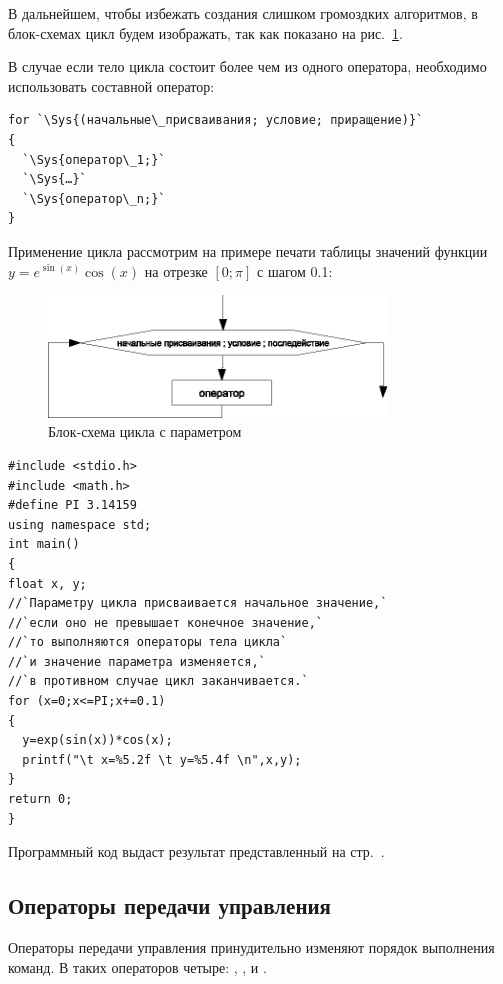 В дальнейшем, чтобы избежать создания слишком громоздких алгоритмов, в блок-схемах цикл  будем
изображать, так как показано на рис.~\ref{ch03:refDrawing25}.

В случае если тело цикла состоит более чем из одного оператора, необходимо использовать составной оператор:
\begin{lstlisting}
for `\Sys{(начальные\_присваивания; условие; приращение)}`
{
  `\Sys{оператор\_1;}`
  `\Sys{…}`
  `\Sys{оператор\_n;}`
}
\end{lstlisting}
Применение цикла  рассмотрим на примере печати таблицы значений функции  $y=e^{\sin (x)}\cos (x)$
на отрезке  $[0;\pi]$  с шагом 0.1:
\begin{figure}[htb]
\begin{center}
\includegraphics[width=0.8\textwidth]{img/ris_3_26}
\caption{Блок-схема цикла с параметром}
\label{ch03:refDrawing25}
\end{center}
\end{figure}

\begin{lstlisting}
#include <stdio.h>
#include <math.h>
#define PI 3.14159
using namespace std;
int main()
{
float x, y;
//`Параметру цикла присваивается начальное значение,`
//`если оно не превышает конечное значение,`
//`то выполняются операторы тела цикла`
//`и значение параметра изменяется,`
//`в противном случае цикл заканчивается.`
for (x=0;x<=PI;x+=0.1)
{
  y=exp(sin(x))*cos(x);
  printf("\t x=%5.2f \t y=%5.4f \n",x,y);
}
return 0;
}
\end{lstlisting}

Программный код выдаст результат представленный на стр.~\pageref{ch03:out0}.%

\subsection[Операторы передачи управления]{Операторы передачи управления}
Операторы передачи управления принудительно изменяют порядок выполнения команд. В  таких операторов четыре:
, ,  и .

